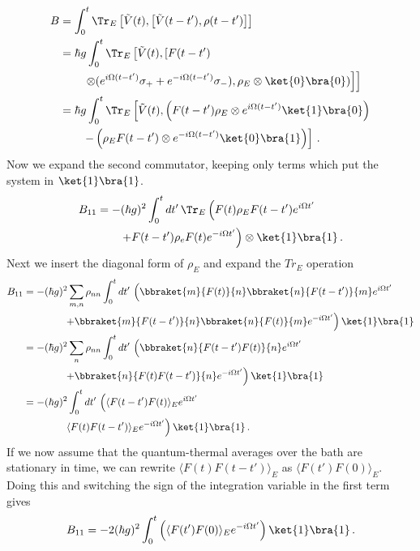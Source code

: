 \begin{align}
B
&= \int_0^t \Tr_E \left[ \tilde{V}(t), \left[ \tilde{V}(t-t'), \rho(t-t') \right] \right] \\
&= \hbar g \int_0^t \Tr_E \left[ \tilde{V}(t),
\left[ F(t-t') \right. \right. \nonumber \\
& \left. \left. \qquad \otimes (e^{i \Omega (t-t')} \sigma_+ + e^{-i \Omega (t-t')} \sigma_-), 
\rho_E \otimes \ket{0}\bra{0} ) \right] \right] \\
&= \hbar g \int_0^t \Tr_E \left[ \tilde{V}(t),
\left( F(t-t')\rho_E \otimes e^{i \Omega (t-t')} \ket{1}\bra{0} \right) \right. \nonumber \\
& \left. \qquad - \left( \rho_E F(t-t') \otimes e^{-i \Omega (t-t')} \ket{0}\bra{1} \right)
\right] \, . 
\end{align}
Now we expand the second commutator, keeping only terms which put the system in $\ket{1}\bra{1}$.
\begin{align}
B_{11}
&= - (\hbar g)^2 \int_0^t dt' \, \Tr_E \left(
F(t) \rho_E F(t-t') e^{i \Omega t'} \right. \nonumber \\
& \left. \qquad + F(t-t') \rho_e F(t) e^{-i \Omega t'}
\right) \otimes \ket{1}\bra{1} \, .
\end{align}
Next we insert the diagonal form of $\rho_E$ and expand the $Tr_E$ operation
\begin{align}
B_{11}
&= - (\hbar g)^2 \sum_{m,n} \rho_{nn} \int_0^t dt' \,
\left(
\bbraket{m}{F(t)}{n} \bbraket{n}{F(t-t')}{m}e^{i \Omega t'} \right. \nonumber \\
& \left. \qquad \qquad + \bbraket{m}{F(t-t')}{n} \bbraket{n}{F(t)}{m} e^{-i \Omega t'}
\right) \ket{1}\bra{1} \\
&= - (\hbar g)^2 \sum_n \rho_{nn} \int_0^t dt' \, \left(
\bbraket{n}{F(t-t')F(t)}{n} e^{i \Omega t'} \right. \nonumber \\
& \left. \qquad \qquad + \bbraket{n}{F(t)F(t-t')}{n} e^{-i \Omega t'}
\right) \ket{1}\bra{1} \\
&= - (\hbar g)^2 \int_0^t dt' \, \left(
\langle F(t-t') F(t) \rangle_E e^{i \Omega t'} \right. \nonumber \\
& \left. \qquad \qquad \langle F(t) F(t-t') \rangle_E e^{-i \Omega t'}
\right) \ket{1}\bra{1} \, .
\end{align}
If we now assume that the quantum-thermal averages over the bath are stationary in time, we can rewrite \mbox{$\langle F(t) F(t-t') \rangle_E$} as \mbox{$\langle F(t')F(0) \rangle_E$}.
Doing this and switching the sign of the integration variable in the first term gives
\begin{equation}
B_{11} = - 2 (\hbar g)^2 \int_0^t \left(
\langle F(t')F(0) \rangle_E e^{-i \Omega t'} \right)
\ket{1}\bra{1} \, .
\end{equation}



